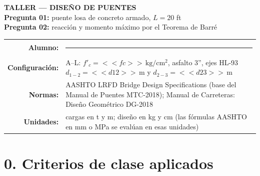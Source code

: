 \documentclass[11pt,a4paper]{article}
\newcommand{\uKg}{\,\mathrm{kg/cm^2}}
\newcommand{\uM}{\,\mathrm{m}}
\begin{document}
\begin{center}
{\LARGE\bfseries\color{acento} TALLER --- DISEÑO DE PUENTES}\\[6pt]
{\large \textbf{Pregunta 01:} puente losa de concreto armado, $L = 20$ ft}\\[2pt]
{\large \textbf{Pregunta 02:} reacción y momento máximo por el Teorema de Barré}\\[10pt]
\begin{tabular}{>{\bfseries}r p{12.9cm}}
Alumno: & \rule{8cm}{0.4pt}\\
Configuración: & A--L: $f'_c = <<fc>>\uKg$, asfalto 3'', ejes HL-93 $d_{1-2} = <<d12>>\uM$ y $d_{2-3} = <<d23>>\uM$\\
Normas: & AASHTO LRFD Bridge Design Specifications (base del Manual de Puentes MTC-2018);
          Manual de Carreteras: Diseño Geométrico DG-2018\\
Unidades: & cargas en t y m; diseño en kg y cm (las fórmulas AASHTO en mm o MPa se evalúan en esas unidades)
\end{tabular}
\end{center}

\section*{0. Criterios de clase aplicados}
\end{document}
